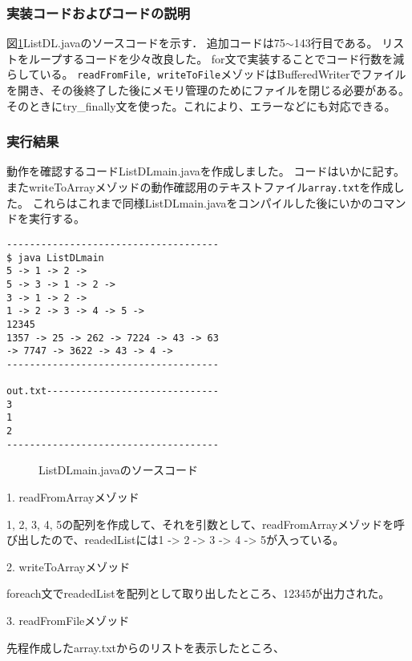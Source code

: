 \documentclass[10.5pt,a4paper]{jsarticle}
\newcommand{\figref}[1]{図\ref{#1}}
\begin{document}
\subsubsection{実装コードおよびコードの説明}

\figref{code:ListDL}ListDL.javaのソースコードを示す．
追加コードは75$\sim$143行目である。
リストをループするコードを少々改良した。
for文で実装することでコード行数を減らしている。
\texttt{readFromFile, writeToFile}メゾッドはBufferedWriterでファイルを開き、その後終了した後にメモリ管理のためにファイルを閉じる必要がある。
そのときにtry\_finally文を使った。これにより、エラーなどにも対応できる。

\subsubsection{実行結果}

動作を確認するコードListDLmain.javaを作成しました。
コードはいかに記す。
またwriteToArrayメゾッドの動作確認用のテキストファイル\texttt{array.txt}を作成した。
これらはこれまで同様ListDLmain.javaをコンパイルした後にいかのコマンドを実行する。

\begin{verbatim}
-------------------------------------
$ java ListDLmain
5 -> 1 -> 2 -> 
5 -> 3 -> 1 -> 2 -> 
3 -> 1 -> 2 -> 
1 -> 2 -> 3 -> 4 -> 5 -> 
12345
1357 -> 25 -> 262 -> 7224 -> 43 -> 63
-> 7747 -> 3622 -> 43 -> 4 -> 
-------------------------------------

out.txt------------------------------
3
1
2
-------------------------------------
\end{verbatim}

\begin{figure}[t]
  \begin{center}
   
   \caption{ListDLmain.javaのソースコード}
   \label{code:ListDL}
  \end{center}
 \end{figure}

1. readFromArrayメゾッド

{1, 2, 3, 4, 5}の配列を作成して、それを引数として、readFromArrayメゾッドを呼び出したので、readedListには1 -> 2 -> 3 -> 4 -> 5が入っている。

2. writeToArrayメゾッド

foreach文でreadedListを配列として取り出したところ、12345が出力された。

3. readFromFileメゾッド

先程作成したarray.txtからのリストを表示したところ、
\end{document}
